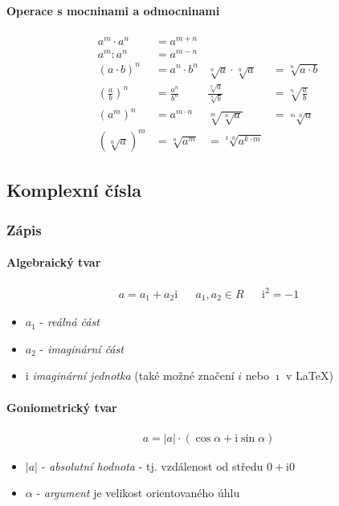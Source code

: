 \documentclass[12pt]{article}
\providecommand{\abs}[1]{\lvert#1\rvert}
\newcommand{\iu}{\mathrm{i}} %
\begin{document}
\paragraph{Operace s mocninami a odmocninami}
\begin{align}
a^m \cdot a^n &= a^{m+n} \\
a^m : a^n &= a^{m-n} &\\
(a \cdot b)^n &=a^n \cdot b^n & \sqrt[n]{a} \cdot \sqrt[n]{a} &= \sqrt[n]{a \cdot b} \\
\left(  \frac{a}{b}\right)^n &= \frac{a^n}{b^n} & \frac{\sqrt[n]{a}}{\sqrt[n]{b}} &= \sqrt[n]{\frac{a}{b}}\\
(a^m)^n &= a^{m \cdot n} & \sqrt[m]{\sqrt[n]{a}} &= \sqrt[m \cdot n]{a}\\
\left( \sqrt[n]{a} \right)^m &= \sqrt[n]{a^m} &= \sqrt[k\cdot n]{a^{k\cdot m}}
\end{align}
\subsection{Komplexní čísla}
\subsubsection{Zápis}
\paragraph{Algebraický tvar}
\begin{align}
a = a_1 + a_2 \iu && a_1,a_2 \in R && \iu^2 = -1
\end{align}
\begin{itemize}
\item $a_1$ - \emph{reálná část}
\item $a_2$ - \emph{imaginární část}
\item $\iu$  \emph{imaginární jednotka} (také možné značení $i$ nebo $\imath$ v \LaTeX)
\end{itemize}
\paragraph{Goniometrický tvar}
\begin{align}
a = \abs{a} \cdot \left( \cos \alpha + \iu \sin \alpha \right)
\end{align}
\begin{itemize}
\item $\abs{a}$ - \emph{absolutní hodnota} - tj. vzdálenost od středu $0 + \iu 0$
\item $\alpha$ - \emph{argument} je velikost orientovaného úhlu
\end{itemize}
\end{document}

